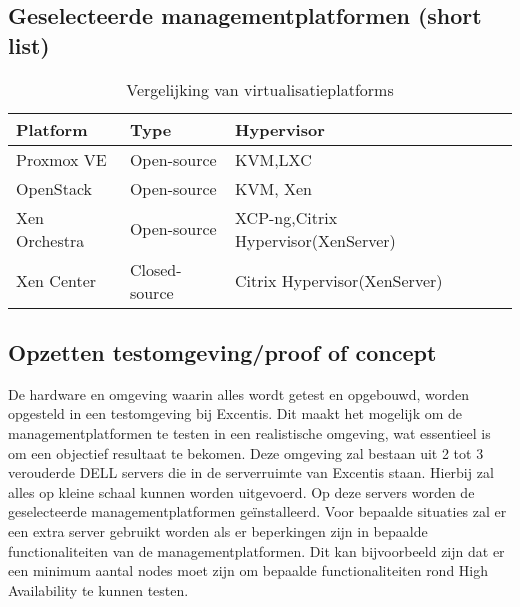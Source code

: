 \subsection{Geselecteerde managementplatformen (short list)} 
\begin{table}[h!]
    \centering
    \begin{tabular}{|l|l|l|l|}
    \hline
    \textbf{Platform} & \textbf{Type} & \textbf{Hypervisor} \\ \hline
    \hline
    Proxmox VE        & Open-source   & KVM,LXC             \\ \hline
    OpenStack         & Open-source   & KVM, Xen            \\ \hline
    Xen Orchestra  & Open-source & XCP-ng,Citrix Hypervisor(XenServer) \\ \hline
    Xen Center  & Closed-source & Citrix Hypervisor(XenServer) \\ \hline
    \hline
    \end{tabular}
    \caption{Vergelijking van virtualisatieplatforms}
\end{table}
\newpage
\subsection{Opzetten testomgeving/proof of concept}
De hardware en omgeving waarin alles wordt getest en opgebouwd, worden opgesteld in een testomgeving bij Excentis. Dit maakt het mogelijk om de managementplatformen te testen in een realistische omgeving, wat essentieel is om een objectief resultaat te bekomen.
Deze omgeving zal bestaan uit 2 tot 3 verouderde DELL servers die in de serverruimte van Excentis staan. Hierbij zal alles op kleine schaal kunnen worden uitgevoerd.
Op deze servers worden de geselecteerde managementplatformen geïnstalleerd.
Voor bepaalde situaties zal er een extra server gebruikt worden als er beperkingen zijn in bepaalde functionaliteiten van de managementplatformen. Dit kan bijvoorbeeld zijn dat er een minimum aantal nodes moet zijn om bepaalde functionaliteiten rond High Availability te kunnen testen.
